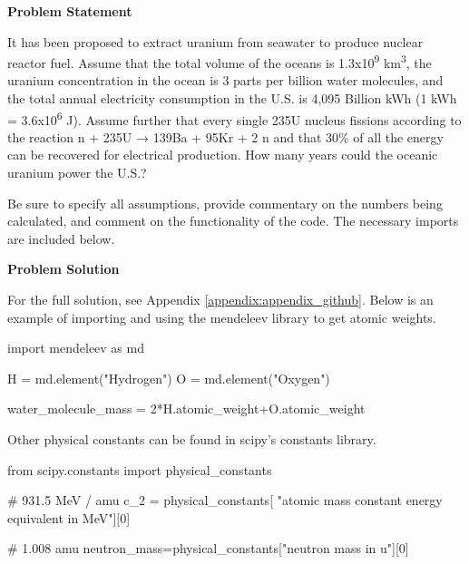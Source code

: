 \label{nuclear_assignment_1}

\begin{tcolorbox}[breakable, enhanced jigsaw, title=NE 495: Assignment \ref{nuclear_assignment_1}, 
    colframe=ksu-purple, colback=ksu-gray]

    \textbf{Problem Statement}

    It has been proposed to extract uranium from seawater to produce nuclear reactor fuel. 
    Assume that the total volume of the oceans is 1.3x10\textsuperscript{9} km\textsuperscript{3}, the uranium 
    concentration in the ocean is 3 parts per billion water molecules, and the total annual 
    electricity consumption in the U.S. is 4,095 Billion kWh (1 kWh = 3.6x10\textsuperscript{6} J). Assume further 
    that every single 235U nucleus fissions according to the reaction n + 235U → 139Ba + 95Kr + 2 n 
    and that 30\% of all the energy can be recovered for electrical production. How many years could the oceanic 
    uranium power the U.S.?

    Be sure to specify all assumptions, provide commentary on the numbers being calculated, and comment on the 
    functionality of the code. The necessary imports are included below.

    \tcblower
    \textbf{Problem Solution}

    For the full solution, see Appendix \ref{appendix:appendix_github}. Below is an example of 
    importing and using the mendeleev library to get atomic weights.

\begin{python}
import mendeleev as md

H = md.element("Hydrogen")
O = md.element("Oxygen")

water_molecule_mass = 2*H.atomic_weight+O.atomic_weight
\end{python}

Other physical constants can be found in scipy's constants library.

\begin{python}
from scipy.constants import physical_constants

# 931.5 MeV / amu
c_2 = physical_constants[
    "atomic mass constant energy equivalent in MeV"][0]

# 1.008 amu
neutron_mass=physical_constants["neutron mass in u"][0]
\end{python}

\end{tcolorbox}

